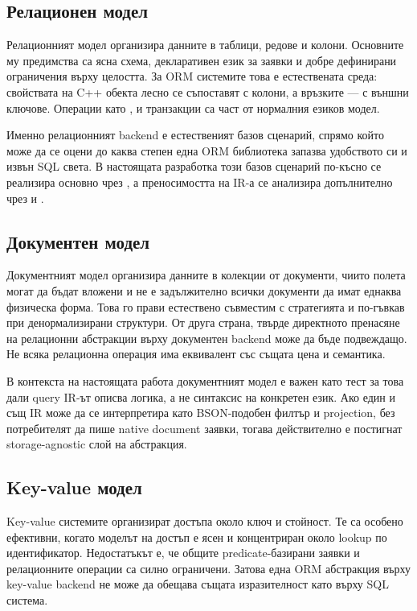 \subsection{Релационен модел}

Релационният модел организира данните в таблици, редове и колони. Основните му предимства са ясна схема, декларативен език за заявки и добре дефинирани ограничения върху целостта. За ORM системите това е естествената среда: свойствата на C++ обекта лесно се съпоставят с колони, а връзките --- с външни ключове. Операции като ,  и транзакции са част от нормалния езиков модел.

Именно релационният backend е естественият базов сценарий, спрямо който може да се оцени до каква степен една ORM библиотека запазва удобството си и извън SQL света. В настоящата разработка този базов сценарий по-късно се реализира основно чрез , а преносимостта на IR-а се анализира допълнително чрез  и .

\subsection{Документен модел}

Документният модел организира данните в колекции от документи, чиито полета могат да бъдат вложени и не е задължително всички документи да имат еднаква физическа форма. Това го прави естествено съвместим с  стратегията и по-гъвкав при денормализирани структури. От друга страна, твърде директното пренасяне на релационни абстракции върху документен backend може да бъде подвеждащо. Не всяка релационна операция има еквивалент със същата цена и семантика.

В контекста на настоящата работа документният модел е важен като тест за това дали query IR-ът описва логика, а не синтаксис на конкретен език. Ако един и същ IR може да се интерпретира като BSON-подобен филтър и projection, без потребителят да пише native document заявки, тогава действително е постигнат storage-agnostic слой на абстракция.

\subsection{Key-value модел}

Key-value системите организират достъпа около ключ и стойност. Те са особено ефективни, когато моделът на достъп е ясен и концентриран около lookup по идентификатор. Недостатъкът е, че общите predicate-базирани заявки и релационните операции са силно ограничени. Затова една ORM абстракция върху key-value backend не може да обещава същата изразителност като върху SQL система.

